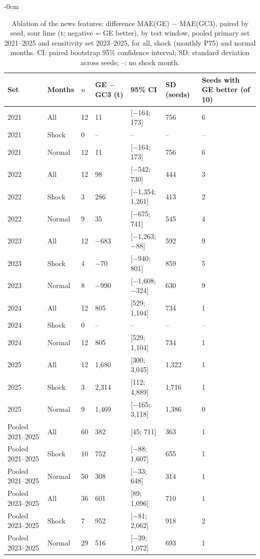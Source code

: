 \begin{table}[H]
\centering
\footnotesize
\setlength{\tabcolsep}{4pt}
\caption{Ablation of the news features: difference MAE(GE) $-$ MAE(GC3), paired by seed, sour lime (t; negative = GE better), by test window, pooled primary set 2021--2025 and sensitivity set 2023--2025, for all, shock (monthly P75) and normal months. CI: paired bootstrap 95\% confidence interval; SD: standard deviation across seeds; --: no shock month.}
\label{tab:T11_ablacion_sutil}
\begin{adjustwidth}{-\extralength}{0cm}
\centering
\begin{tabular}{lllllll}
\toprule
Set & Months & $n$ & GE $-$ GC3 (t) & 95\% CI & SD (seeds) & Seeds with GE better (of 10) \\
\midrule
2021 & All & 12 & 11 & [$-$164; 173] & 756 & 6 \\
2021 & Shock & 0 & -- & -- & -- & -- \\
2021 & Normal & 12 & 11 & [$-$164; 173] & 756 & 6 \\
2022 & All & 12 & 98 & [$-$542; 730] & 444 & 3 \\
2022 & Shock & 3 & 286 & [$-$1,354; 1,261] & 413 & 2 \\
2022 & Normal & 9 & 35 & [$-$675; 741] & 545 & 4 \\
2023 & All & 12 & $-$683 & [$-$1,263; $-$88] & 592 & 9 \\
2023 & Shock & 4 & $-$70 & [$-$940; 801] & 859 & 5 \\
2023 & Normal & 8 & $-$990 & [$-$1,608; $-$324] & 630 & 9 \\
2024 & All & 12 & 805 & [529; 1,104] & 734 & 1 \\
2024 & Shock & 0 & -- & -- & -- & -- \\
2024 & Normal & 12 & 805 & [529; 1,104] & 734 & 1 \\
2025 & All & 12 & 1,680 & [300; 3,045] & 1,322 & 1 \\
2025 & Shock & 3 & 2,314 & [112; 4,889] & 1,716 & 1 \\
2025 & Normal & 9 & 1,469 & [$-$165; 3,118] & 1,386 & 0 \\
Pooled 2021--2025 & All & 60 & 382 & [45; 711] & 363 & 1 \\
Pooled 2021--2025 & Shock & 10 & 752 & [$-$88; 1,607] & 655 & 1 \\
Pooled 2021--2025 & Normal & 50 & 308 & [$-$33; 648] & 314 & 1 \\
Pooled 2023--2025 & All & 36 & 601 & [89; 1,096] & 710 & 1 \\
Pooled 2023--2025 & Shock & 7 & 952 & [$-$81; 2,062] & 918 & 2 \\
Pooled 2023--2025 & Normal & 29 & 516 & [$-$39; 1,072] & 693 & 1 \\
\bottomrule
\end{tabular}
\end{adjustwidth}
\end{table}

